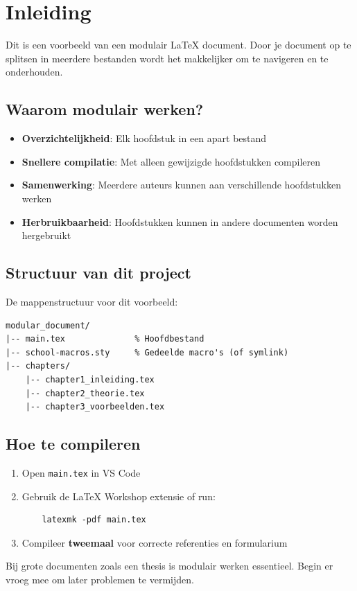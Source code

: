 
\chapter{Inleiding}
\label{ch:inleiding}

Dit is een voorbeeld van een modulair LaTeX document. Door je document op te splitsen
in meerdere bestanden wordt het makkelijker om te navigeren en te onderhouden.

\section{Waarom modulair werken?}

\begin{conceptbox}[title=Voordelen van modulaire documenten]
\begin{itemize}
    \item \textbf{Overzichtelijkheid}: Elk hoofdstuk in een apart bestand
    \item \textbf{Snellere compilatie}: Met \verb|| alleen gewijzigde hoofdstukken compileren
    \item \textbf{Samenwerking}: Meerdere auteurs kunnen aan verschillende hoofdstukken werken
    \item \textbf{Herbruikbaarheid}: Hoofdstukken kunnen in andere documenten worden hergebruikt
\end{itemize}
\end{conceptbox}

\section{Structuur van dit project}

De mappenstructuur voor dit voorbeeld:
\begin{verbatim}
modular_document/
|-- main.tex              % Hoofdbestand
|-- school-macros.sty     % Gedeelde macro's (of symlink)
|-- chapters/
    |-- chapter1_inleiding.tex
    |-- chapter2_theorie.tex
    |-- chapter3_voorbeelden.tex
\end{verbatim}

\section{Hoe te compileren}

\begin{oefenblok}[title=Compilatie instructies]
\begin{enumerate}
    \item Open \texttt{main.tex} in VS Code
    \item Gebruik de LaTeX Workshop extensie of run:
    \begin{verbatim}
    latexmk -pdf main.tex
    \end{verbatim}
    \item Compileer \textbf{tweemaal} voor correcte referenties en formularium
\end{enumerate}
\end{oefenblok}

\begin{examenbox}
Bij grote documenten zoals een thesis is modulair werken essentieel. 
Begin er vroeg mee om later problemen te vermijden.
\end{examenbox}
